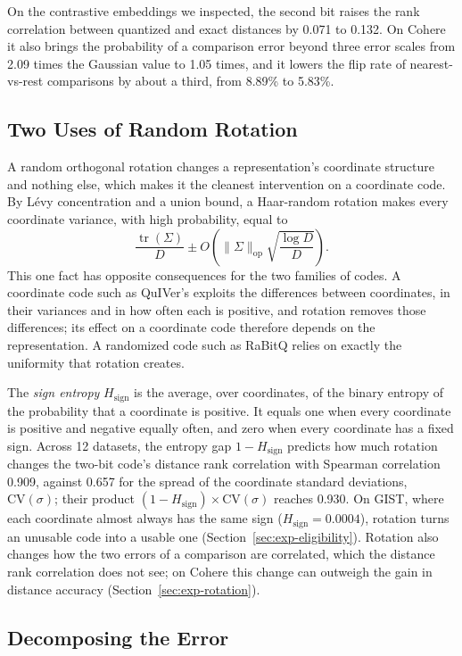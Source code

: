 \documentclass[twoside,11pt]{article}
\newcommand{\tr}{\operatorname{tr}}
\begin{document}
On the contrastive embeddings we inspected, the second bit raises the rank correlation between quantized and exact distances by 0.071 to 0.132. On Cohere it also brings the probability of a comparison error beyond three error scales from 2.09 times the Gaussian value to 1.05 times, and it lowers the flip rate of nearest-vs-rest comparisons by about a third, from 8.89\% to 5.83\%.

\subsection{Two Uses of Random Rotation}
\label{sec:rotation}

A random orthogonal rotation changes a representation's coordinate structure and nothing else, which makes it the cleanest intervention on a coordinate code. By L\'evy concentration and a union bound, a Haar-random rotation makes every coordinate variance, with high probability, equal to
\[
\frac{\tr(\Sigma)}{D}\pm O\!\left(\|\Sigma\|_{\mathrm{op}}\sqrt{\frac{\log D}{D}}\right).
\]
This one fact has opposite consequences for the two families of codes. A coordinate code such as QuIVer's exploits the differences between coordinates, in their variances and in how often each is positive, and rotation removes those differences; its effect on a coordinate code therefore depends on the representation. A randomized code such as RaBitQ relies on exactly the uniformity that rotation creates.

The \emph{sign entropy} $H_{\mathrm{sign}}$ is the average, over coordinates, of the binary entropy of the probability that a coordinate is positive. It equals one when every coordinate is positive and negative equally often, and zero when every coordinate has a fixed sign. Across 12 datasets, the entropy gap $1-H_{\mathrm{sign}}$ predicts how much rotation changes the two-bit code's distance rank correlation with Spearman correlation 0.909, against 0.657 for the spread of the coordinate standard deviations, $\mathrm{CV}(\sigma)$; their product $(1-H_{\mathrm{sign}})\times\mathrm{CV}(\sigma)$ reaches 0.930. On GIST, where each coordinate almost always has the same sign ($H_{\mathrm{sign}}=0.0004$), rotation turns an unusable code into a usable one (Section~\ref{sec:exp-eligibility}). Rotation also changes how the two errors of a comparison are correlated, which the distance rank correlation does not see; on Cohere this change can outweigh the gain in distance accuracy (Section~\ref{sec:exp-rotation}).

\subsection{Decomposing the Error}
\label{sec:error-decomposition}
\end{document}

